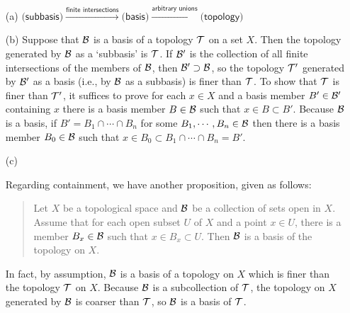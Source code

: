 \begin{rmk}
    \begin{enumerate}
        \item[(a)]
        {
            $
            \textsf{(subbasis)}\xrightarrow{\textsf{finite intersections}}
            \textsf{(basis)}\xrightarrow{\textsf{arbitrary unions}}
            \textsf{(topology)}
            $
        }
        \item[(b)]
        {
            Suppose that ${\mathcal{B}}$ is a basis of a topology ${\mathcal{T}}$ on a set $X$.
            Then the topology generated by ${\mathcal{B}}$ as a `subbasis' is ${\mathcal{T}}$.
            If ${\mathcal{B}}'$ is the collection of all finite intersections of the members of ${\mathcal{B}}$, then ${\mathcal{B}}'\supset{\mathcal{B}}$, so the topology ${\mathcal{T}}'$ generated by ${\mathcal{B}}'$ as a basis (i.e., by ${\mathcal{B}}$ as a subbasis) is finer than ${\mathcal{T}}$.
            To show that ${\mathcal{T}}$ is finer than ${\mathcal{T}}'$, it suffices to prove for each $x\in X$ and a basis member $B'\in{\mathcal{B}}'$ containing $x$ there is a basis member $B\in{\mathcal{B}}$ such that $x\in B\subset B'$.
            Because ${\mathcal{B}}$ is a basis, if $B'=B_1\cap\cdots\cap B_n$ for some $B_1, \cdots, B_n\in{\mathcal{B}}$ then there is a basis member $B_0\in{\mathcal{B}}$ such that $x\in B_0\subset B_1\cap\cdots\cap B_n=B'$.
        }
        \item[(c)]
        {
            Regarding containment, we have another proposition, given as follows:
            \begin{quotation}
                Let $X$ be a topological space and ${\mathcal{B}}$ be a collection of sets open in $X$.
                Assume that for each open subset $U$ of $X$ and a point $x\in U$, there is a member $B_x\in{\mathcal{B}}$ such that $x\in B_x\subset U$.
                Then ${\mathcal{B}}$ is a basis of the topology on $X$.
            \end{quotation}
            In fact, by assumption, ${\mathcal{B}}$ is a basis of a topology on $X$ which is finer than the topology ${\mathcal{T}}$ on $X$.
            Because ${\mathcal{B}}$ is a subcollection of ${\mathcal{T}}$, the topology on $X$ generated by ${\mathcal{B}}$ is coarser than ${\mathcal{T}}$, so ${\mathcal{B}}$ is a basis of ${\mathcal{T}}$.
        }
    \end{enumerate}
\end{rmk}